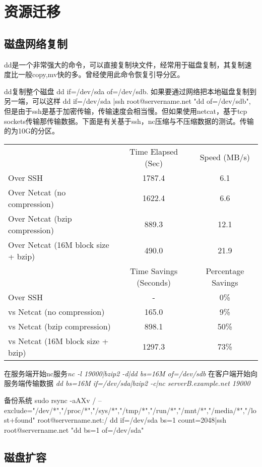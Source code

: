 \chapter{资源迁移}

\section{磁盘网络复制}

dd是一个非常强大的命令，可以直接复制块文件，经常用于磁盘复制，其复制速度比一般copy,mv快的多。曾经使用此命令恢复引导分区。


dd复制整个磁盘  dd if=/dev/sda of=/dev/sdb. 如果要通过网络把本地磁盘复制到另一端，可以这样 dd if=/dev/sda |ssh root@servername.net "dd of=/dev/sdb", 但是由于ssh是基于加密传输，传输速度会相当慢。但如果使用netcat，基于tcp sockets传输那传输数据。下面是有关基于ssh，nc压缩与不压缩数据的测试。传输的为10G的分区。

\begin{tabular}{l|cc}
 	& Time Elapsed (Sec)	& Speed (MB/s) \\
Over SSH	& 1787.4	& 6.1 \\
Over Netcat (no compression) &	1622.4 & 	6.6 \\
Over Netcat (bzip compression) &	 889.3	& 12.1 \\
Over Netcat (16M block size + bzip)	 & 490.0 &	21.9 \\
  \hline
& Time Savings (Seconds) & 	Percentage Savings \\
Over SSH &	- &	0\% \\
vs Netcat (no compression)	& 165.0 &	9\% \\
vs Netcat (bzip compression)	 & 898.1 &	50\% \\
vs Netcat (16M block size + bzip) &	1297.3	& 73\% 
\end{tabular}


在服务端开始nc服务\textsl{nc -l 19000|bzip2 -d|dd bs=16M of=/dev/sdb}  在客户端开始向服务端传输数据 \textsl{dd bs=16M if=/dev/sda|bzip2 -c|nc serverB.example.net 19000}


备份系统 sudo rsync -aAXv / --exclude={"/dev/*","/proc/*","/sys/*","/tmp/*","/run/*","/mnt/*","/media/*","/lost+found"} root@servername.net:/
dd if=/dev/sda bs=1 count=2048|ssh root@servername.net "dd bs=1 of=/dev/sda"


\section{磁盘扩容}

